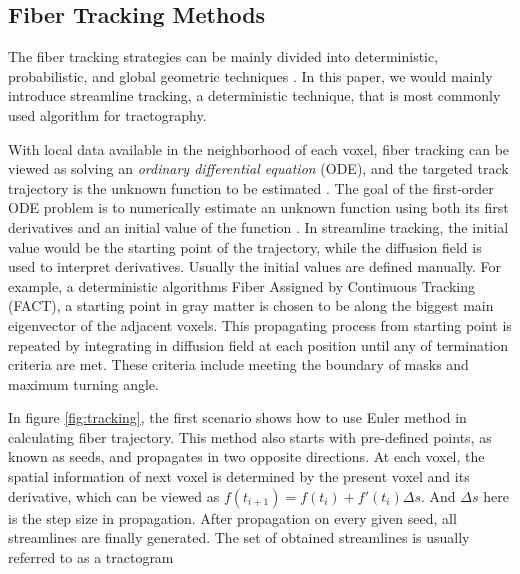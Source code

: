 \subsection{Fiber Tracking Methods}

The fiber tracking strategies can be mainly divided into deterministic, probabilistic, and global geometric techniques \cite*[]{ozarslanAnisotropyFieldsScales2021}.
In this paper, we would mainly introduce streamline tracking, a deterministic technique, that is most commonly used algorithm for tractography.

With local data available in the neighborhood of each voxel, fiber tracking can be viewed as solving an \textit{ordinary differential equation} (ODE), 
and the targeted track trajectory is the unknown function to be estimated \cite*{daducciCOMMITConvexOptimization2015}\cite*{yehTractographyMethodsFindings2021}.
The goal of the first-order ODE problem is to numerically estimate an unknown function using both its first derivatives and an initial value of the function \cite*[]{yehTractographyMethodsFindings2021}.
In streamline tracking, the initial value would be the starting point of the trajectory, while the diffusion field is used to interpret derivatives.
Usually the initial values are defined manually. For example, a deterministic algorithms Fiber Assigned by Continuous Tracking (FACT), 
a starting point in gray matter is chosen to be along the biggest main eigenvector of the adjacent voxels. 
This propagating process from starting point is repeated by integrating in diffusion field at each position until any of termination criteria are met. These criteria include
meeting the boundary of masks and maximum turning angle. 

In figure \ref*{fig:tracking}, the first scenario shows how to use Euler method in calculating fiber trajectory. 
This method also starts with pre-defined points, as known as seeds, and propagates in two opposite directions. At each voxel, the spatial 
information of next voxel is determined by the present voxel and its derivative, 
which can be viewed as $f(t_{i+1}) = f(t_{i}) + f'(t_{i})\Delta s$. And $\Delta s$ here is the step size in propagation.
After propagation on every given seed, all streamlines are finally generated.
The set of obtained streamlines is usually referred to as a tractogram

